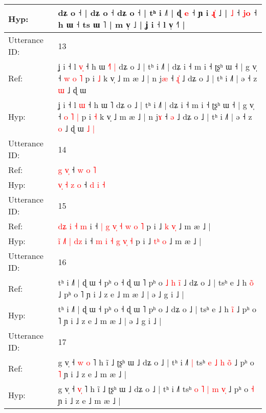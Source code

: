 \documentclass[10pt]{article}
\DeclareRobustCommand{\hl}[1]{{\textcolor{red}{#1}}}
\begin{document}
\begin{longtable}{ll}
 \\
Hyp: & dʑ o ˧ | dʑ o ˧ dʑ o ˧ | tʰ i ˩˥ | ɖ \hl{e} ˧ ɲ i\hl{}\hl{}\hl{}\hl{}\hl{}\hl{}\hl{}\hl{}\hl{}\hl{} \hl{}\hl{}\hl{ɻ}\hl{̍} ˩ |\hl{}\hl{} \hl{˩} ˧\hl{}\hl{} \hl{j}\hl{o} ˧ h ɯ ˧ ts ɯ \hl{}˥ | m v̩ ˩ | ʝ i ˧ l v̩ ˧˥ |
 \\
\midrule
Utterance ID: & 13 \\
Ref: & ʝ i ˧ l \hl{v}\hl{̩} ˧ h ɯ \hl{˧}˥\hl{ }\hl{|} dʑ o ˩ | tʰ i ˩˥ | dʑ i ˧ m i ˧ ʈʂʰ ɯ ˧ | g v̩ ˧ \hl{w} \hl{o} \hl{˥} p i \hl{˩} k v̩ ˩ m æ ˩ | n j\hl{æ} ˧ \hl{ɻ}\hl{̍} ˩ dʑ o ˩ | tʰ i ˩˥ | ə ˧ z \hl{ɯ} ˩ ɖ ɯ\hl{}\hl{}\hl{}\hl{}
 \\
Hyp: & ʝ i ˧ l \hl{}\hl{ɯ} ˧ h ɯ \hl{}˥\hl{}\hl{} dʑ o ˩ | tʰ i ˩˥ | dʑ i ˧ m i ˧ ʈʂʰ ɯ ˧ | g v̩ ˧ \hl{o} \hl{˥} \hl{|} p i \hl{˧} k v̩ ˩ m æ ˩ | n j\hl{ɤ} ˧ \hl{}\hl{ə} ˩ dʑ o ˩ | tʰ i ˩˥ | ə ˧ z \hl{o} ˩ ɖ ɯ\hl{ }\hl{˩}\hl{ }\hl{|}
 \\
\midrule
Utterance ID: & 14 \\
Ref: & \hl{}\hl{}\hl{}\hl{g} \hl{}\hl{v}\hl{̩} ˧ \hl{w} \hl{o} \hl{˥}
 \\
Hyp: & \hl{v}\hl{̩}\hl{ }\hl{˧} \hl{z}\hl{ }\hl{o} ˧ \hl{d} \hl{i} \hl{˧}
 \\
\midrule
Utterance ID: & 15 \\
Ref: & \hl{d}\hl{ʑ} \hl{}\hl{i} \hl{˧} \hl{}\hl{m} i ˧ \hl{|} \hl{g} \hl{v}\hl{̩} \hl{˧} \hl{w}\hl{ }\hl{o} \hl{˥} p i ˩ \hl{k}\hl{ }\hl{v}\hl{̩} ˩ m æ ˩ |
 \\
Hyp: & \hl{i}\hl{̃} \hl{˩}\hl{˥} \hl{|} \hl{d}\hl{z} i ˧ \hl{m} \hl{i} \hl{}\hl{˧} \hl{g} \hl{}\hl{v}\hl{̩} \hl{˧} p i ˩ \hl{t}\hl{ʰ}\hl{ }\hl{o} ˩ m æ ˩ |
 \\
\midrule
Utterance ID: & 16 \\
Ref: & tʰ i ˩˥ | ɖ ɯ ˧ pʰ o ˧ ɖ ɯ ˥ pʰ o\hl{ }\hl{˩}\hl{ }\hl{h}\hl{ }\hl{i}\hl{̃} ˩ dʑ o ˩ | tsʰ e ˩ h \hl{o}̃ ˩ pʰ o ˥ ɲ i ˩ z e ˩ m æ ˩ | ə ˩ g i ˩ |
 \\
Hyp: & tʰ i ˩˥ | ɖ ɯ ˧ pʰ o ˧ ɖ ɯ ˥ pʰ o\hl{}\hl{}\hl{}\hl{}\hl{}\hl{}\hl{} ˩ dʑ o ˩ | tsʰ e ˩ h \hl{i}̃ ˩ pʰ o ˥ ɲ i ˩ z e ˩ m æ ˩ | ə ˩ g i ˩ |
 \\
\midrule
Utterance ID: & 17 \\
Ref: & g v̩ ˧ \hl{w}\hl{ }\hl{o} ˥ h ĩ ˩ ʈʂʰ ɯ ˩ dʑ o ˩ | tʰ i ˩˥\hl{ }\hl{|} tsʰ\hl{}\hl{} \hl{e} \hl{˩} \hl{h} \hl{o}\hl{̃} ˩ pʰ o \hl{˥} ɲ i ˩ z e ˩ m æ ˩ |
 \\
Hyp: & g v̩ ˧ \hl{}\hl{v}\hl{̩} ˥ h ĩ ˩ ʈʂʰ ɯ ˩ dʑ o ˩ | tʰ i ˩˥\hl{}\hl{} tsʰ\hl{ }\hl{o} \hl{˥} \hl{|} \hl{m} \hl{v}\hl{̩} ˩ pʰ o \hl{˧} ɲ i ˩ z e ˩ m æ ˩ |

\end{longtable}
\end{document}
